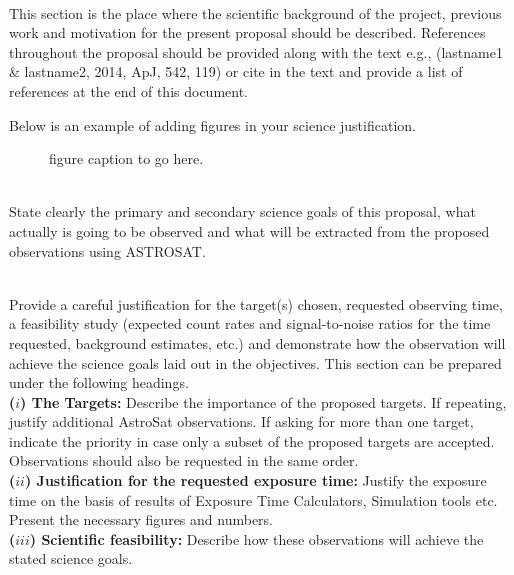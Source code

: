 \documentclass[11pt]{article}            %
\begin{document}
\smallskip
{}
\smallskip\\

This section is the place where the scientific background of the
project, previous work and motivation for the present
proposal should be described. References throughout the proposal
should be provided along with the text e.g., (lastname1 \& lastname2,
2014, ApJ, 542, 119) or cite in the text and provide a list of
references at the end of this document.  

%

  Below is an example of adding figures in your science justification.

\begin{figure}[h]
\centering


%
\caption{\footnotesize
{figure caption to go here. }}
\label{fig1}
\end{figure}

\smallskip
{}
\smallskip\\
State clearly the primary and secondary science goals of this proposal, what actually is going 
to be observed and what will be extracted from the proposed observations using ASTROSAT.

%
\smallskip
{}
\smallskip\\
Provide a careful justification for the target(s) chosen, requested observing time,
a feasibility study (expected count rates and signal-to-noise ratios
for the time requested, background estimates, etc.) and demonstrate
how the observation will achieve the science goals laid out in the objectives.
This section can be prepared under the following headings. \\
{\bf ($i$) The Targets:} Describe the importance of the proposed targets. If repeating, justify additional AstroSat observations. If asking for more than one target, indicate the priority in case 
only a subset of the proposed targets are accepted. Observations 
should also be requested in the same order. \\
{\bf ($ii$) Justification for the requested exposure time:} Justify the exposure time on the basis of results of Exposure Time Calculators, Simulation tools etc.  Present the necessary figures and numbers.\\
{\bf ($iii$) Scientific feasibility:} Describe how these observations will achieve the stated science goals.
\end{document}
